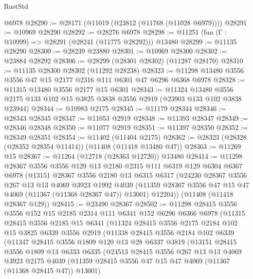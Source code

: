 \begin{lexlean}{RustStd}
\begin{coremodule}
    @6978
@28290 := @28171 (@11019 (@23812 (@11768 (@11028 @6979))))
@28291 := @10969 @28290
@28292 := @28276 @6978
@28298 := @11251 (fun (Γ : @10999) => @28291 (@28241 (@11775 @28292))) @13480
@28299 := @11135 @28290
@28300 := @28239 @23880
@28301 := @10969 @28300
@28302 := @23884 @28292
@28306 := @28299 (@28301 @28302) (@11287 @28170)
@28310 := @11135 @28300 @28302 (@11292 @28238)
@28323 := @11298 @13480 @3556 @3556 @47 @15 @2177 @2316 @111 @6301 @47 @6296 @6368 @6978
@28328 := @11315 @13480 @3556 @2177 @15 @6301
@28343 := @11324
    @13480
    @3556
    @2175
    @133
    @102
    @15
    @3825
    @3838
    @3556
    @2919
    (@23903 @133 @102 @3838 @23944)
@28344 := @10983 @2175
@28345 := @11179 @28344
@28346 := @28343 @28345
@28347 := @11053 @2919
@28348 := @11393 @28347
@28349 := @28346 @28348
@28350 := @11077 @2919
@28351 := @11397 @28350
@28352 := @28349 @28351
@28354 := @11402 (@11404 @2175)
@28362 := @28323 (@28328 (@28352 @28354 @11414)) (@11408 (@11418 @13480 @47))
@28363 := @11269 @15
@28367 := @11264 (@12718 (@28363 @12720)) @13480
@28414 := @11298
    @28367
    @3556
    @3556
    @129
    @13
    @2180
    @2315
    @111
    @6319
    @129
    @6304
    @6367
    @6978
    (@13151
      @28367
      @3556
      @2180
      @13
      @6315
      @6317
      (@24230
        @28367
        @3556
        @267
        @13
        @13
        @4069
        @3923
        @1992
        @4039
        (@11359 @28367 @3556 @47 @15 @47 @4069 (@11367 (@11368 @28367 @47)) @13001)
        @12204))
    (@11408 (@11418 @28367 @129))
@28415 := @23490 @28367
@28502 := @11298
    @28415
    @3556
    @3556
    @152
    @15
    @2185
    @2314
    @111
    @6341
    @152
    @6296
    @6366
    @6978
    (@11315
      @28415
      @3556
      @2185
      @15
      @6341
      (@11324
        @28415
        @3556
        @2175
        @2184
        @102
        @15
        @3825
        @6339
        @3556
        @2919
        (@11338
          @28415
          @3556
          @2184
          @102
          @6339
          (@11347
            @28415
            @3556
            @1809
            @120
            @13
            @28
            @6337
            @3819
            (@13151
              @28415
              @3556
              @1809
              @13
              @6333
              @6335
              (@24513
                @28415
                @3556
                @267
                @13
                @13
                @4069
                @3923
                @2175
                @4039
                (@11359 @28415 @3556 @47 @15 @47 @4069 (@11367 (@11368 @28415 @47)) @13001)

\end{coremodule}
\end{lexlean}
